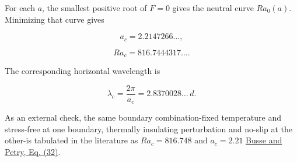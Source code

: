 For each $a$, the smallest positive root of $F=0$ gives the neutral curve $Ra_0(a)$. Minimizing that curve gives

\[
a_c=2.2147266\ldots,
\]

\[
Ra_c=816.7444317\ldots.
\]

The corresponding horizontal wavelength is

\[
\lambda_c=\frac{2\pi}{a_c}=2.8370028\ldots\,d.
\]

As an external check, the same boundary combination-fixed temperature and stress-free at one boundary, thermally insulating perturbation and no-slip at the other-is tabulated in the literature as $Ra_c=816.748$ and $a_c=2.21$ \href{\detokenize{https://www.zimmermann.physik.uni-bayreuth.de/pool/publikationen/2009/Homologous_onset_of_double_layer_convection/Homologous_onset_of_double_layer_convection.pdf}}{Busse and Petry, Eq. (32)}.
